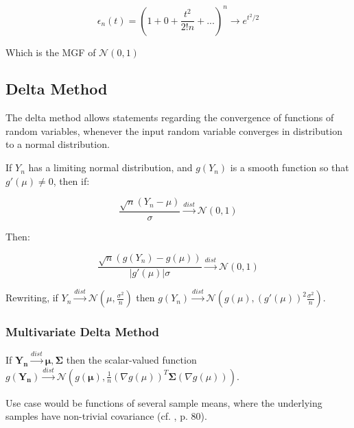\begin{equation}
\epsilon_n(t) = \left(1+0+\frac{t^2}{2! n} + ... \right)^n \rightarrow e^{t^2/2}
\end{equation}

Which is the MGF of $\mathscr{N}(0,1)$

\subsection{Delta Method}

The delta method allows statements regarding the convergence of functions of random variables, whenever the input random variable converges in distribution to a normal distribution. 

If $Y_n$ has a limiting normal distribution, and $g(Y_n )$ is a smooth function so that $g'(\mu) \neq 0$, then if:

\begin{equation}
\frac{\sqrt{n}(Y_n - \mu)}{\sigma} \xrightarrow{dist} \mathscr{N}(0,1)
\end{equation}

Then:

\begin{equation}
\frac{\sqrt{n}(g(Y_n)-g(\mu))}{|g'(\mu)|\sigma}\xrightarrow{dist}\mathscr{N}(0,1)
\end{equation}

Rewriting, if $Y_n \xrightarrow{dist}\mathscr{N}(\mu,\frac{\sigma^2}{n})$ then $g(Y_n)\xrightarrow{dist}\mathscr{N}(g(\mu),(g'(\mu))^2\frac{\sigma^2}{n})$.

\subsubsection{Multivariate Delta Method}

If $\mathbf{Y_n} \xrightarrow{dist}\mathscr{\mathbf{\mu},\mathbf{\Sigma}}$ then the scalar-valued function $g(\mathbf{Y_n}) \xrightarrow{dist}\mathscr{N}(g(\mathbf{\mu}),\frac{1}{n} (\nabla g(\mu))^T \mathbf{\Sigma} (\nabla g(\mu)) )$.

Use case would be functions of several sample means, where the underlying samples have non-trivial covariance (cf. \cite{wasserman2013all}, p. 80).

